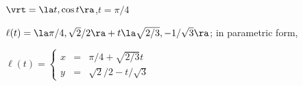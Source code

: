 {$\vrt = \la t,\cos t \ra$,\quad $t=\pi/4$
}
{$\ell(t) = \la \pi/4,\sqrt{2}/{2}\ra + t\la \sqrt{2/3},-1/\sqrt{3}\ra$; in parametric form,

$\ell(t) = \left\{\begin{array}{ccc} x&=&\pi/4+\sqrt{2/3}t \\ y &=& \sqrt{2}/2-t/\sqrt{3}\end{array}\right.$
}